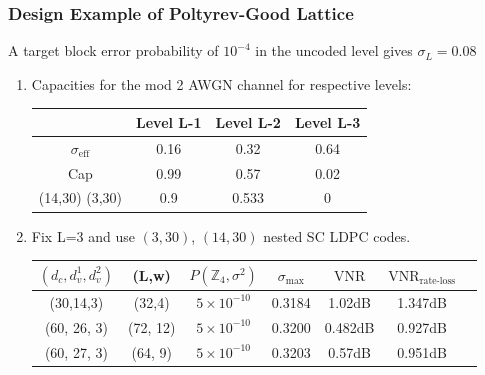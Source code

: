 \documentclass[10pt]{beamer}
\newcommand{\Z}{\mathbb{Z}}
\begin{document}
\begin{frame}\frametitle{Design Example of Poltyrev-Good Lattice}
A target block error probability of $10^{-4}$ in the uncoded level gives $\sigma_{L}=0.08$
\begin{enumerate}
\item  Capacities for the mod 2 AWGN  channel for respective levels: 
\vspace{0.1in}
\begin{center}
\begin{tabular}{| c | c | c | c | }
\hline
 & Level L-1   &  Level L-2  & Level L-3 \\
\hline 
$\sigma_{\text{eff}}$ & 0.16   &  0.32  & 0.64 \\ \hline
 Cap                             &  0.99 & 0.57 & 0.02 \\   \hline
 (14,30) (3,30)         &  0.9 & 0.533 & 0 \\   \hline
\end{tabular}
\end{center}
\pause
\vspace{0.1in}
\item Fix L=3 and use $(3,30)$, $(14,30)$ nested SC LDPC codes.
\vspace{0.07in}
\begin{center}
\begin{tabular}{c c c c c c c}
\hline  \hline
$(d_{c},d_{v}^{1},d_{v}^{2})$ &(L,w)& $P(\Z_{4},\sigma^{2})$ & $\sigma_{\text{max}}$ &$\text{VNR}$ &$\text{VNR}_{\text{rate-loss}}$\\
\hline
(30,14,3) & (32,4) & $5 \times 10^{-10}$ & 0.3184 & 1.02dB & 1.347dB\pause \\
(60, 26, 3)& (72, 12)& $5 \times 10^{-10}$ & 0.3200 &0.482dB & 0.927dB\\
(60, 27, 3)& (64, 9)& $5 \times 10^{-10}$  &  0.3203 & 0.57dB & 0.951dB\\
\end{tabular}
\end{center}
\end{enumerate}
\end{frame}
\end{document}
